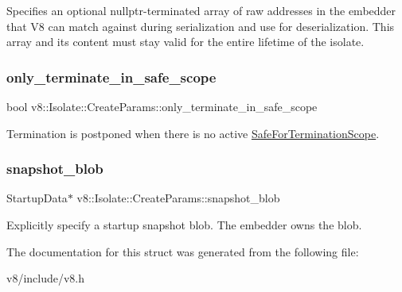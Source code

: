 Specifies an optional nullptr-\/terminated array of raw addresses in the embedder that V8 can match against during serialization and use for deserialization. This array and its content must stay valid for the entire lifetime of the isolate. \mbox{\label{structv8_1_1Isolate_1_1CreateParams_af44a854a07944452589128b6cf3b9958}} 
\subsubsection{\texorpdfstring{only\+\_\+terminate\+\_\+in\+\_\+safe\+\_\+scope}{only\_terminate\_in\_safe\_scope}}
{\footnotesize\ttfamily bool v8\+::\+Isolate\+::\+Create\+Params\+::only\+\_\+terminate\+\_\+in\+\_\+safe\+\_\+scope}

Termination is postponed when there is no active \mbox{\hyperlink{classv8_1_1Isolate_1_1SafeForTerminationScope}{Safe\+For\+Termination\+Scope}}. \mbox{\label{structv8_1_1Isolate_1_1CreateParams_a25d38476e4dec79ae96c59292eee4a64}} 
\subsubsection{\texorpdfstring{snapshot\+\_\+blob}{snapshot\_blob}}
{\footnotesize\ttfamily Startup\+Data$\ast$ v8\+::\+Isolate\+::\+Create\+Params\+::snapshot\+\_\+blob}

Explicitly specify a startup snapshot blob. The embedder owns the blob. 

The documentation for this struct was generated from the following file\+:\begin{DoxyCompactItemize}
\item 
v8/include/v8.\+h\end{DoxyCompactItemize}

